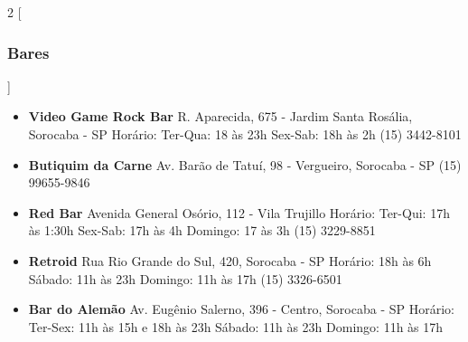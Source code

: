 \begin{multicols}{2}
  [
  \subsubsection{Bares}
  ]
  \begin{itemize}
    \item \textbf{Video Game Rock Bar}
      \newline R. Aparecida, 675 - Jardim Santa Rosália, Sorocaba - SP
      \newline Horário: Ter-Qua: 18 às 23h Sex-Sab: 18h às 2h
      \newline (15) 3442-8101
  \end{itemize}
  \begin{itemize}
    \item \textbf{Butiquim da Carne}
      \newline Av. Barão de Tatuí, 98 - Vergueiro, Sorocaba - SP
      \newline (15) 99655-9846
  \end{itemize}
  \begin{itemize}
    \item \textbf{Red Bar}
      \newline Avenida General Osório, 112 - Vila Trujillo
      \newline Horário: Ter-Qui: 17h às 1:30h
      \newline Sex-Sab: 17h às 4h
      \newline Domingo: 17 às 3h
      \newline (15) 3229-8851
  \end{itemize}
  \begin{itemize}
    \item \textbf{Retroid}
      \newline Rua Rio Grande do Sul, 420, Sorocaba - SP
      \newline Horário: 18h às 6h
      \newline Sábado: 11h às 23h Domingo: 11h às 17h
      \newline (15) 3326-6501
  \end{itemize}
  \begin{itemize}
    \item \textbf{Bar do Alemão}
      \newline Av. Eugênio Salerno, 396 - Centro, Sorocaba - SP
      \newline Horário: Ter-Sex: 11h às 15h e 18h às 23h
      \newline Sábado: 11h às 23h Domingo: 11h às 17h

\end{itemize}
\end{multicols}
